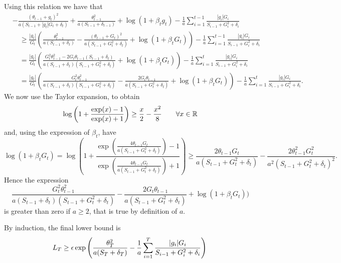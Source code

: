 Using this relation we have that
\begin{align}
&-\frac{(\theta_{t-1}+g_t)^2}{a (S_{t-1}+|g_t| G_t+\delta_t)} + \frac{\theta_{t-1}^2}{a (S_{t-1}+\delta_{t-1})}+\log(1+\beta_t g_t)-\frac{1}{a}\sum_{i=1}^{t-1} \frac{|g_i| G_i}{S_{i-1} + G^2_i + \delta_i} \\
&\quad \geq \frac{|g_t|}{G_t} (\frac{\theta_{t-1}^2}{a (S_{t-1}+\delta_t)} - \frac{(\theta_{t-1}+G_t)^2}{a (S_{t-1} + G^2_t+ \delta_t)} + \log(1+\beta_t G_t)) - \frac{1}{a}\sum_{i=1}^{t-1} \frac{|g_i| G_i}{S_{i-1} + G^2_i + \delta_i}\\
&\quad = \frac{|g_t|}{G_t} (\frac{G^2_t \theta_{t-1}^2 -2 G_t \theta_{t-1} (S_{t-1} +\delta_t)}{a (S_{t-1}+\delta_t)(S_{t-1} + G^2_t +\delta_t)} + \log(1+\beta_t G_t)) - \frac{1}{a}\sum_{i=1}^{t} \frac{|g_i| G_i}{S_{i-1} + G^2_i + \delta_i}\\
&\quad = \frac{|g_t|}{G_t} (\frac{G^2_t \theta_{t-1}^2}{a (S_{t-1}+\delta_t)(S_{t-1} + G^2_t +\delta_t)}-\frac{2 G_t \theta_{t-1}}{a (S_{t-1} + G^2_t+\delta_t)} + \log(1+\beta_t G_t)) - \frac{1}{a}\sum_{i=1}^{t} \frac{|g_i| G_i}{S_{i-1} + G^2_i + \delta_i}.
\end{align}
We now use the Taylor expansion, to obtain
\[
\log\left(1+\frac{\exp(x)-1}{\exp(x)+1}\right) \geq \frac{x}{2} -\frac{x^2}{8} \qquad \forall x \in \mathbb{R}
\]
and, using the expression of $\beta_t$, have
\[
\log\left(1+\beta_t G_t\right) 
= \log\left(1+\frac{\exp\left(\frac{4 \theta_{t-1} G_t}{a (S_{t-1} + G^2_t+\delta_t)}\right)-1}{\exp\left(\frac{4 \theta_{t-1} G_t}{a (S_{t-1} + G^2_t+\delta_t)}\right)+1}\right) 
\geq \frac{2 \theta_{t-1} G_t}{a (S_{t-1} + G^2_t+\delta_t)} -\frac{2 \theta_{t-1}^2 G_t^2}{a^2 (S_{t-1} + G^2_t+\delta_t)^2}.
\]
Hence the expression 
\[
\frac{G^2_t \theta_{t-1}^2}{a (S_{t-1}+\delta_t)(S_{t-1} + G^2_t +\delta_t)}-\frac{2 G_t \theta_{t-1}}{a (S_{t-1} + G^2_t+\delta_t)} + \log(1+\beta_t G_t))
\]
is greater than zero if $a \geq 2$, that is true by definition of $a$.

By induction, the final lower bound is 
\[
L_{T} \geq \epsilon \exp\left(\frac{\theta_{T}^2}{a (S_{T}+\delta_T)} - \frac{1}{a}\sum_{i=1}^{T} \frac{|g_i| G_i}{S_{i-1} + G^2_i +\delta_i} \right) \\
\]


